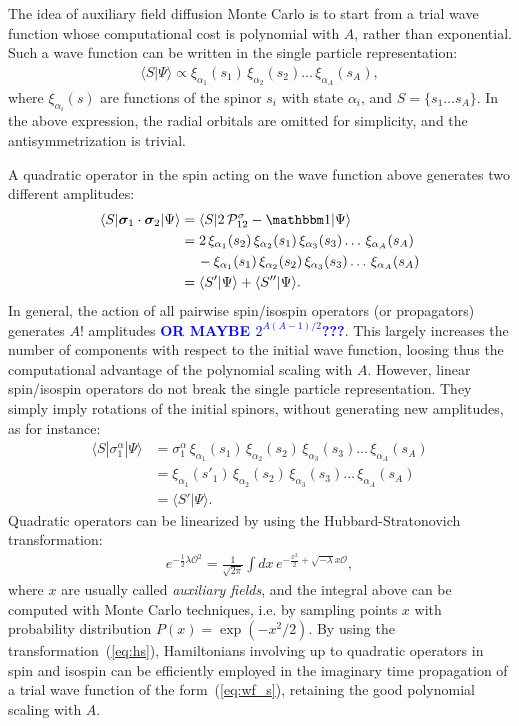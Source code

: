 \documentclass[aps,prc,twocolumn,superscriptaddress,showpacs,floatfix,nofootinbib]{revtex4-1}
\newcommand{\blue}[1]{\protect\textcolor{blue}{#1}}
\begin{document}
The idea of auxiliary field diffusion Monte Carlo is to start from a trial wave function
whose computational cost is polynomial with $A$, rather than exponential.
Such a wave function can be written in the single particle representation:
\begin{align}
\langle S|\Psi\rangle\propto\xi_{\alpha_1}(s_1)\,\xi_{\alpha_2}(s_2)\dots\,\xi_{\alpha_A}(s_A) ,
\label{eq:wf_s}
\end{align}
where $\xi_{\alpha_i}(s)$ are functions of the spinor $s_i$ with state $\alpha_i$,
and $S=\{s_1\dots s_A\}$. In the above expression, the radial orbitals are omitted for simplicity, 
and the antisymmetrization is trivial.

A quadratic operator in the spin acting on the wave function above generates two different amplitudes:
\begin{align}
\langle S|\bm\sigma_1\cdot\bm\sigma_2|\Psi\rangle & =\langle S|2\,\mathcal P_{12}^\sigma-\mathbbm1|\Psi\rangle \nonumber \\
& =2\,\xi_{\alpha_1}(s_2)\,\xi_{\alpha_2}(s_1)\,\xi_{\alpha_3}(s_3)\dots\,\xi_{\alpha_A}(s_A) \nonumber \\
& \quad\,-\xi_{\alpha_1}(s_1)\,\xi_{\alpha_2}(s_2)\,\xi_{\alpha_3}(s_3)\dots\,\xi_{\alpha_A}(s_A) \nonumber \\
& =\langle S'|\Psi\rangle+\langle S''|\Psi\rangle .
\nonumber
\end{align}
In general, the action of all pairwise spin/isospin operators (or propagators) generates $A!$ amplitudes \blue{\bf OR MAYBE $2^{A(A-1)/2}$???}.
This largely increases the number of components with respect to the initial wave function, loosing thus the 
computational advantage of the polynomial scaling with $A$.
However, linear spin/isospin operators do not break the single particle representation. 
They simply imply rotations of the initial spinors, without generating new amplitudes, as for instance:
\begin{align}
\langle S|\sigma_1^\alpha|\Psi\rangle &=
\sigma_1^\alpha\,\xi_{\alpha_1}(s_1)\,\xi_{\alpha_2}(s_2)\,\xi_{\alpha_3}(s_3)\dots\,\xi_{\alpha_A}(s_A) \nonumber \\
& =\xi_{\alpha_1}(s'_1)\,\xi_{\alpha_2}(s_2)\,\xi_{\alpha_3}(s_3)\dots\,\xi_{\alpha_A}(s_A) \nonumber \\
& =\langle S'|\Psi\rangle .
\nonumber
\end{align}
Quadratic operators can be linearized by using the Hubbard-Stratonovich transformation:
\begin{align}
e^{-\frac{1}{2}\lambda \mathcal O^2}=\frac{1}{\sqrt{2\pi}}\int dx\, e^{-\frac{x^2}{2}+\sqrt{-\lambda}x\mathcal O} ,
\label{eq:hs}
\end{align}
where $x$ are usually called \emph{auxiliary fields}, and the integral above can
be computed with Monte Carlo techniques, i.e. by sampling points $x$ with  
probability distribution $P(x)=\exp(-x^2/2)$. By using the transformation~(\ref{eq:hs}),
Hamiltonians involving up to quadratic operators in spin and isospin can be efficiently
employed in the imaginary time propagation of a trial wave function of the form~(\ref{eq:wf_s}),
retaining the good polynomial scaling with $A$.
\end{document}
